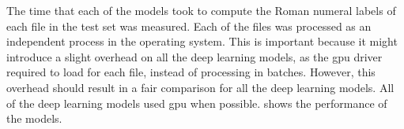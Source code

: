 
The time that each of the models took to compute the Roman
numeral labels of each file in the test set was measured.
Each of the files was processed as an independent process in
the operating system. This is important because it might
introduce a slight overhead on all the deep learning models,
as the \gls{gpu} driver required to load for each file,
instead of processing in batches. However, this overhead
should result in a fair comparison for all the deep learning
models. All of the deep learning models used \gls{gpu} when
possible.  shows the performance of
the models.


